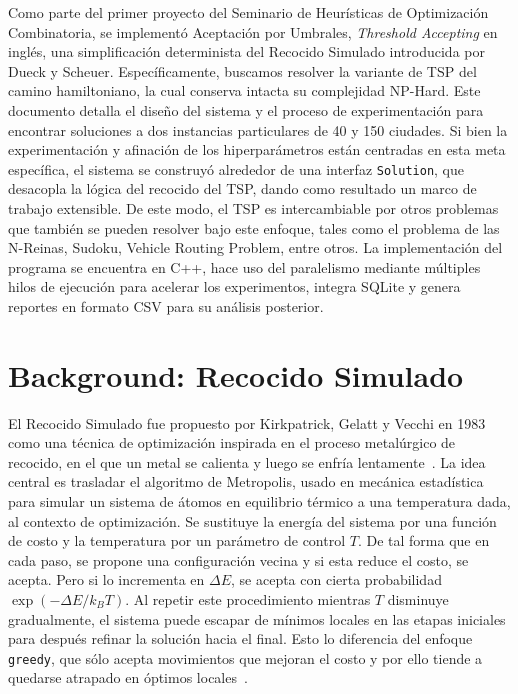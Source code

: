 \documentclass[9pt,a4paper,twocolumn,twoside]{rho-class/rho}
\begin{document}
Como parte del primer proyecto del Seminario de Heurísticas de Optimización Combinatoria,
se implementó Aceptación por Umbrales, \textit{Threshold Accepting} en inglés, una simplificación
determinista del Recocido Simulado introducida por Dueck y Scheuer. Específicamente, buscamos 
resolver la variante de TSP del camino hamiltoniano, la cual conserva intacta su complejidad 
NP-Hard. Este documento detalla el diseño del sistema y el proceso de experimentación para encontrar 
soluciones a dos instancias particulares de 40 y 150 ciudades. Si bien la experimentación y 
afinación de los hiperparámetros están centradas en esta meta específica, el sistema se 
construyó alrededor de una interfaz \texttt{Solution}, que desacopla la lógica del recocido del
TSP, dando como resultado un marco de trabajo extensible. De este modo, el TSP es intercambiable
por otros problemas que también se pueden resolver bajo este enfoque, tales como el problema de 
las N-Reinas, Sudoku, Vehicle Routing Problem, entre otros. La implementación del programa se 
encuentra en C++, hace uso del paralelismo mediante múltiples hilos de ejecución para acelerar 
los experimentos, integra SQLite y genera reportes en formato CSV para su análisis posterior.

\section{Background: Recocido Simulado}

El Recocido Simulado fue propuesto por Kirkpatrick, Gelatt y Vecchi en 1983 como una técnica de
optimización inspirada en el proceso metalúrgico de recocido, en el que un metal se calienta
y luego se enfría lentamente~\cite{kirkpatrick1983}.
La idea central es trasladar el algoritmo de Metropolis, usado en mecánica estadística para
simular un sistema de átomos en equilibrio térmico a una temperatura dada, al contexto de
optimización. Se sustituye la energía del sistema por una función de costo y la temperatura por
un parámetro de control $T$. De tal forma que en cada paso, se propone una configuración vecina
y si esta reduce el costo, se acepta. Pero si lo incrementa en $\Delta E$, se acepta con
cierta probabilidad $\exp(-\Delta E / k_B T)$. Al repetir este procedimiento mientras $T$
disminuye gradualmente, el sistema puede escapar de mínimos locales en las etapas iniciales
para después refinar la solución hacia el final. Esto lo diferencia
del enfoque \texttt{greedy}, que sólo acepta movimientos que mejoran el costo y por ello
tiende a quedarse atrapado en óptimos locales~\cite{delahaye2019}. \\
 
\end{document}
